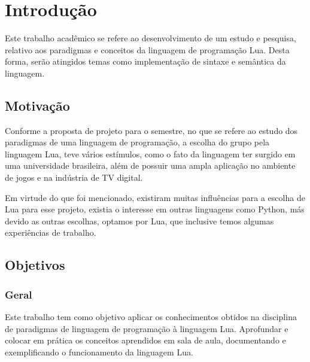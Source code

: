 \documentclass[
12pt, %
openright, %
oneside, %
a4paper, %
english, %
brazil, %
]{abntex2}
\begin{document}
\tableofcontents*
\cleardoublepage

\textual

\chapter{Introdução}
Este trabalho acadêmico se refere ao desenvolvimento de um estudo e pesquisa, relativo aos paradigmas e conceitos da linguagem de programação Lua. Desta forma, serão atingidos temas como implementação de sintaxe e semântica da linguagem.

\section{Motivação}
Conforme a proposta de projeto para o semestre, no que se refere ao estudo dos paradigmas de uma linguagem de programação, a escolha do grupo pela linguagem Lua, teve vários estímulos, como o fato da linguagem ter surgido em uma universidade brasileira, além de possuir uma ampla aplicação no ambiente de jogos e na indústria de TV digital.

Em virtude do que foi mencionado, existiram muitas influências para a escolha de Lua para esse projeto, existia o interesse em outras linguagens como Python, más devido as outras escolhas, optamos por Lua, que inclusive temos algumas experiências de trabalho.

\section{Objetivos}

\subsection{Geral}
Este trabalho tem como objetivo aplicar os conhecimentos obtidos na disciplina de paradigmas de linguagem de programação à linguagem Lua. Aprofundar e colocar em prática os conceitos aprendidos em sala de aula, documentando e exemplificando o funcionamento da linguagem Lua.
\end{document}
